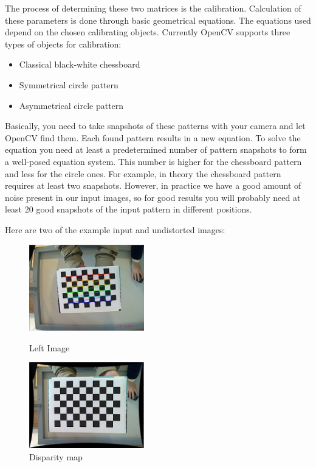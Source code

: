 \documentclass[11pt]{report}
\begin{document}
The process of determining these two matrices is the calibration. Calculation of these parameters is done through basic geometrical equations. The equations used depend on the chosen calibrating objects. Currently OpenCV supports three types of objects for calibration:

\begin{itemize}
 \item Classical black-white chessboard
 \item Symmetrical circle pattern
 \item Asymmetrical circle pattern
\end{itemize}

Basically, you need to take snapshots of these patterns with your camera and let OpenCV find them. Each found pattern results in a new equation. To solve the equation you need at least a predetermined number of pattern snapshots to form a well-posed equation system. This number is higher for the chessboard pattern and less for the circle ones. For example, in theory the chessboard pattern requires at least two snapshots. However, in practice we have a good amount of noise present in our input images, so for good results you will probably need at least 20 good snapshots of the input pattern in different positions.

Here are two of the example input and undistorted images:



\begin{figure}
\centering
\parbox{5cm}{
\includegraphics[width=5cm]{normal.jpg}
\caption{Left Image}
\label{fig:2figsA}}
\qquad
\begin{minipage}{5cm}
\includegraphics[width=5cm]{undist.jpg}
\caption{Disparity map}
\label{fig:2figsB}
\end{minipage}
\end{figure}
\end{document}
